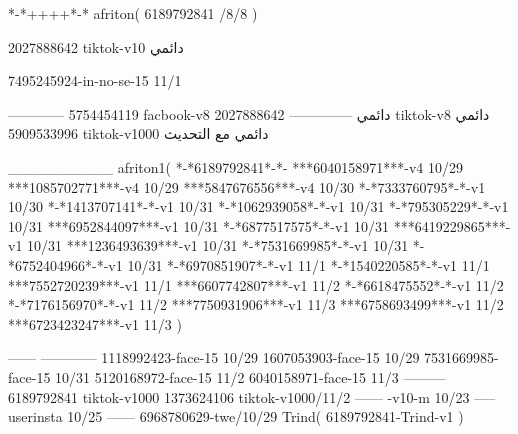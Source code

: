 *-*++++*-*
afriton(
6189792841 /8/8
)

2027888642 tiktok-v10
دائمي


7495245924-in-no-se-15 11/1

------------
5754454119 facbook-v8
دائمي
--------------
2027888642 tiktok-v8
دائمي
5909533996 tiktok-v1000
دائمي مع التحديث

__________
afriton1(
*-*6189792841*-*-
***6040158971***-v4 10/29
***1085702771***-v4 10/29
***5847676556***-v4 10/30
*-*7333760795*-*-v1 10/30
*-*1413707141*-*-v1 10/31
*-*1062939058*-*-v1 10/31
*-*795305229*-*-v1 10/31
***6952844097***-v1 10/31
*-*6877517575*-*-v1 10/31
***6419229865***-v1 10/31
***1236493639***-v1 10/31
*-*7531669985*-*-v1 10/31
*-*6752404966*-*-v1 10/31
*-*6970851907*-*-v1 11/1
*-*1540220585*-*-v1 11/1
***7552720239***-v1 11/1
***6607742807***-v1 11/2
*-*6618475552*-*-v1 11/2
*-*7176156970*-*-v1 11/2
***7750931906***-v1 11/3
***6758693499***-v1 11/2
***6723423247***-v1 11/3
)

------
------------
1118992423-face-15 10/29
1607053903-face-15 10/29
7531669985-face-15 10/31
5120168972-face-15 11/2
6040158971-face-15 11/3
---------
6189792841 tiktok-v1000
1373624106 tiktok-v1000/11/2
------
-v10-m 10/23
-----
userinsta 10/25
------
6968780629-twe/10/29
Trind(
6189792841-Trind-v1 
)

